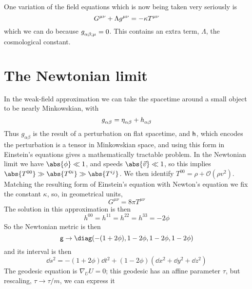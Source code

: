 One variation of the field equations which is now being taken very
seriously is
\begin{equation}
  \label{eq:100}
  \tensor{G}{^{\mu \nu}} + \Lambda \tensor{g}{^{\mu \nu}} 
  = - \kappa \tensor{T}{^{\mu \nu}}
\end{equation}
which we can do because $\tensor{g}{_{\alpha \beta; \mu}}=0$. This
contains an extra term, $\Lambda$, the cosmological constant.

\section{The Newtonian limit}
\label{sec:newtonian-limit}

In the weak-field approximation we can take the spacetime around a
small object to be nearly Minkowskian, with
\begin{equation}
  \label{eq:101}
  \tensor{g}{_{\alpha \beta}} = \tensor{\eta}{_{\alpha \beta}} + \tensor{h}{_{\alpha \beta}}
\end{equation}
Thus $g_{\alpha \beta}$ is the result of a perturbation on flat
spacetime, and $\mathsf{{h}}$, which encodes the perturbation is a tensor
in Minkowskian space, and using this form in Einstein's equations
gives a mathematically tractable problem. In the Newtonian limit we
have $\abs{\phi} \ll 1$, and speeds $\abs{\vec{v}} \ll 1$, so this
implies $\abs{T^{00}} \gg \abs{T^{0i}} \gg \abs{T^{ij}}$. We then
identify $T^{00} = \rho + \mathcal{O}(\rho v^2)$. Matching the
resulting form of Einstein's equation with Newton's equation we fix
the constant $\kappa$, so, in geometrical units,
\begin{equation}
  \label{eq:102}
  G^{\mu \nu} = 8 \pi T^{\mu \nu}
\end{equation}
The solution in this approximation is then
\begin{equation}
  \label{eq:103}
  h^{00} = h^{11} = h^{22} = h^{33} = -2 \phi
\end{equation}
So the Newtonian metric is then
\begin{equation}
  \label{eq:104}
  \ten{g} \to \diag( -(1+ 2\phi), 1- 2\phi, 1-2\phi, 1 - 2 \phi)
\end{equation}
and its interval is then
\begin{equation}
  \label{eq:105}
  \dd{s^2} = -(1+2 \phi) \dd{t}^2 + (1- 2 \phi) (\dd{x}^2 + \dd{y}^2 + \dd{z}^2 )
\end{equation}
The geodesic equation is $\nabla_U U = 0$; this geodesic has an affine
parameter $\tau$, but rescaling, $\tau \to \tau/m$, we can express it
